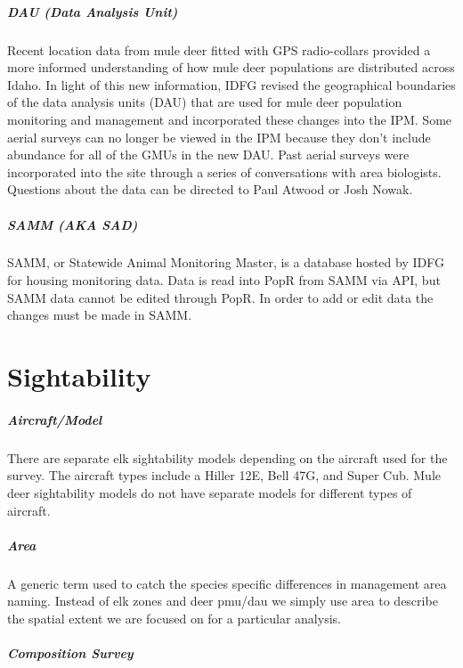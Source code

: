 \documentclass[
]{book}
\begin{document}
\hypertarget{gl-dau}{%
\subparagraph*{DAU (Data Analysis Unit)}\label{gl-dau}}

Recent location data from mule deer fitted with GPS radio-collars provided a more informed understanding of how mule deer populations are distributed across Idaho. In light of this new information, IDFG revised the geographical boundaries of the data analysis units (DAU) that are used for mule deer population monitoring and management and incorporated these changes into the IPM. Some aerial surveys can no longer be viewed in the IPM because they don't include abundance for all of the GMUs in the new DAU. Past aerial surveys were incorporated into the site through a series of conversations with area biologists. Questions about the data can be directed to Paul Atwood or Josh Nowak.

\hypertarget{gl-samm}{%
\subparagraph*{SAMM (AKA SAD)}\label{gl-samm}}

SAMM, or Statewide Animal Monitoring Master, is a database hosted by IDFG for housing monitoring data. Data is read into PopR from SAMM via API, but SAMM data cannot be edited through PopR. In order to add or edit data the changes must be made in SAMM.

\hypertarget{gl-sight}{%
\section{Sightability}\label{gl-sight}}

\hypertarget{gl-aircraft}{%
\subparagraph*{Aircraft/Model}\label{gl-aircraft}}

There are separate elk sightability models depending on the aircraft used for the survey. The aircraft types include a Hiller 12E, Bell 47G, and Super Cub. Mule deer sightability models do not have separate models for different types of aircraft.

\hypertarget{gl-area}{%
\subparagraph*{Area}\label{gl-area}}

A generic term used to catch the species specific differences in management area naming. Instead of elk zones and deer pmu/dau we simply use area to describe the spatial extent we are focused on for a particular analysis.

\hypertarget{gl-comp-survey}{%
\subparagraph*{Composition Survey}\label{gl-comp-survey}}
\end{document}
